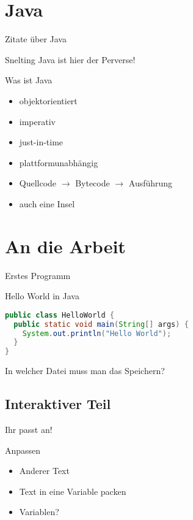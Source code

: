 \documentclass{beamer}
\begin{document}
\section{Java}
\begin{frame}{Zitate über Java}
 \begin{exampleblock}{Snelting}
  Java ist hier der Perverse!
 \end{exampleblock}
\pause
\begin{exampleblock}{Was ist Java} \pause
 \begin{itemize}
  \item objektorientiert
  \item imperativ
  \item just-in-time
  \item plattformunabhängig
  \item Quellcode $\rightarrow$ Bytecode $\rightarrow$ Ausführung
  \pause \item auch eine Insel
 \end{itemize}

\end{exampleblock}

\end{frame}



\section{An die Arbeit}
\begin{frame}[fragile]{Erstes Programm}
\begin{exampleblock}{Hello World in Java}
\begin{lstlisting}[language=java]
public class HelloWorld {
  public static void main(String[] args) {
    System.out.println("Hello World");
  }
}
\end{lstlisting}
\end{exampleblock}
In welcher Datei muss man das Speichern?
\end{frame}

\subsection{Interaktiver Teil}
\begin{frame}{Ihr passt an!}
\begin{exampleblock}{Anpassen}
\begin{itemize}
\item Anderer Text
\pause
\item Text in eine Variable packen
\pause
\item Variablen? 
\end{itemize}
\end{exampleblock}
\end{frame}
\end{document}
